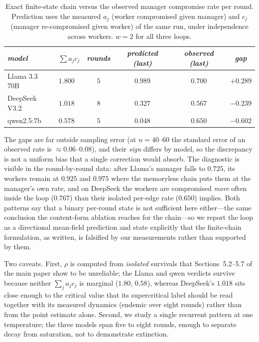 \documentclass[sigconf,anonymous]{aamas}
\begin{document}
\begin{table}[h]
\scriptsize
\centering
\caption{Exact finite-state chain versus the observed manager compromise rate per
round. Prediction uses the measured $a_j$ (worker compromised given manager) and $c_j$
(manager re-compromised given worker) of the same run, under independence across
workers. $w = 2$ for all three loops.}
\vspace{4pt}
\label{tab:cyclic-markov}
\setlength{\tabcolsep}{3pt}
\begin{tabular}{llcccc}
\toprule
\textit{model} & \textit{$\sum a_jc_j$} & \textit{rounds} & \textit{predicted (last)}
& \textit{observed (last)} & \textit{gap} \\
\midrule
Llama 3.3 70B & $1.800$ & $5$ & $0.989$ & $0.700$ & $+0.289$ \\
DeepSeek V3.2 & $1.018$ & $8$ & $0.327$ & $0.567$ & $-0.239$ \\
qwen2.5:7b    & $0.578$ & $5$ & $0.048$ & $0.650$ & $-0.602$ \\
\bottomrule
\end{tabular}
\end{table}

The gaps are far outside sampling error (at $n = 40$--$60$ the standard error of an
observed rate is $\approx 0.06$--$0.08$), and their \emph{sign} differs by model, so the
discrepancy is not a uniform bias that a single correction would absorb. The
diagnostic is visible in the round-by-round data: after Llama's manager falls to
$0.725$, its workers remain at $0.925$ and $0.975$ where the memoryless chain puts them
at the manager's own rate, and on DeepSeek the workers are compromised \emph{more} often
inside the loop ($0.767$) than their isolated per-edge rate ($0.650$) implies. Both
patterns say that a binary per-round state is not sufficient here either---the same
conclusion the content-form ablation reaches for the chain---so we report the loop as a
directional mean-field prediction and state explicitly that the finite-chain
formulation, as written, is falsified by our measurements rather than supported by them.

Two caveats. First, $\rho$ is computed from \emph{isolated} survivals that
Sections~5.2--5.7 of the main paper show to be unreliable; the Llama and
qwen verdicts survive because neither $\sum_j a_jc_j$ is marginal ($1.80$, $0.58$),
whereas DeepSeek's $1.018$ sits close enough to the critical value that its
supercritical label should be read together with its measured dynamics (endemic over
eight rounds) rather than from the point estimate alone. Second, we study a single
recurrent pattern at one temperature; the three models span five to eight rounds,
enough to separate decay from saturation, not to demonstrate extinction.
\end{document}
